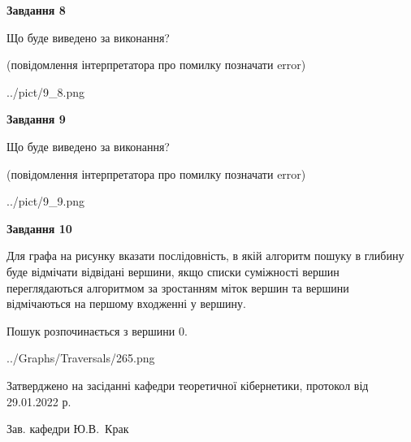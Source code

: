 \documentclass[12pt, ukrainian]{article}
\begin{document}
{\begin {large}
{\begin {center}\textbf{Завдання 8}\end {center}}\par
Що буде виведено за виконання?\par
 (повідомлення інтерпретатора про помилку позначати error)
\begin{center}
	{../pict/9_8.png}
\end{center}
\newpage

{\begin {center}\textbf{Завдання 9}\end {center}}\par
Що буде виведено за виконання?\par
 (повідомлення інтерпретатора про помилку позначати error)\par
\begin{center}
	{../pict/9_9.png}
\end{center}
\newpage

{\begin {center}\textbf{Завдання 10}\end {center}}\par
Для графа на рисунку вказати послідовність, в якій алгоритм пошуку в глибину буде відмічати відвідані вершини, якщо списки суміжності вершин переглядаються алгоритмом за зростанням міток вершин та вершини відмічаються на першому вход\-женні у вершину.\par
Пошук розпочинається з вершини 0.\par

\begin{center}
	{../Graphs/Traversals/265.png}
\end{center}\par
\newpage


\end {large}
}
{\smallskip \begin {small} Затверджено на засіданні кафедри теоретичної кібернетики, протокол  від   29.01.2022 р.\par\smallskip\smallskip
{\parbox {6.5 cm}{Зав. кафедри \dotfill Ю.В.~Крак}} \end{small}}
\end{document}
